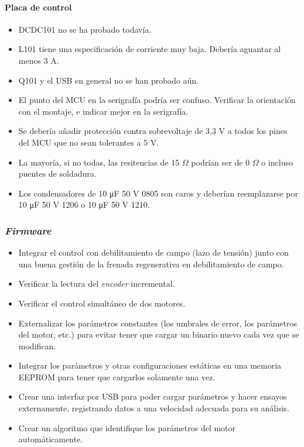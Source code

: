 \paragraph{Placa de control}
\begin{itemize}
	\item DCDC101 no se ha probado todavía.
	\item L101 tiene una especificación de corriente muy baja. Debería aguantar al menos 3 A.
	\item Q101 y el USB en general no se han probado aún.
	\item El punto del MCU en la serigrafía podría ser confuso. Verificar la orientación con el montaje, e indicar mejor en la serigrafía.
	\item Se debería añadir protección contra sobrevoltaje de 3,3 V a todos los pines del MCU que no sean tolerantes a 5 V.
	\item La mayoría, si no todas, las resitencias de 15 $\Omega$ podrían ser de 0 $\Omega$ o incluso puentes de soldadura.
	\item Los condensadores de 10 \unit{\micro\farad} 50 V 0805 son caros y deberían reemplazarse por 10 \unit{\micro\farad} 50 V 1206 o 10 \unit{\micro\farad} 50 V 1210.
\end{itemize}

\subsubsection{\textit{Firmware}}

\begin{itemize}
	\item Integrar el control con debilitamiento de campo (lazo de tensión) junto con una buena gestión de la frenada regenerativa en debilitamiento de campo.
	\item Verificar la lectura del \textit{encoder} incremental.
	\item Verificar el control simultáneo de dos motores.
	\item Externalizar los parámetros constantes (los umbrales de error, los parámetros del motor, etc.) para evitar tener que cargar un binario nuevo cada vez que se modifican.
	\item Integrar los parámetros y otras configuraciones estáticas en una memoria EEPROM para tener que cargarlos solamente una vez.
	\item Crear una interfaz por USB para poder cargar parámetros y hacer ensayos externamente, registrando datos a una velocidad adecuada para su análisis.
	\item Crear un algoritmo que identifique los parámetros del motor automáticamente.
\end{itemize}